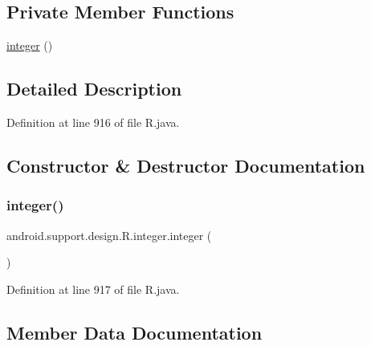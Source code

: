 \subsection*{Private Member Functions}
\begin{DoxyCompactItemize}
\item 
\mbox{\hyperlink{classandroid_1_1support_1_1design_1_1_r_1_1integer_ac80606641d5b9d520d155bdc03704883}{integer}} ()
\end{DoxyCompactItemize}


\subsection{Detailed Description}


Definition at line 916 of file R.\+java.



\subsection{Constructor \& Destructor Documentation}
\mbox{\label{classandroid_1_1support_1_1design_1_1_r_1_1integer_ac80606641d5b9d520d155bdc03704883}} 
\subsubsection{\texorpdfstring{integer()}{integer()}}
{\footnotesize\ttfamily android.\+support.\+design.\+R.\+integer.\+integer (\begin{DoxyParamCaption}{ }\end{DoxyParamCaption})\hspace{0.3cm}{\ttfamily [private]}}



Definition at line 917 of file R.\+java.


\begin{DoxyCode}{0}

\end{DoxyCode}


\subsection{Member Data Documentation}
\mbox{\label{classandroid_1_1support_1_1design_1_1_r_1_1integer_ab0c8a771ad2ae3aba6dc8d9823755f3e}} 
